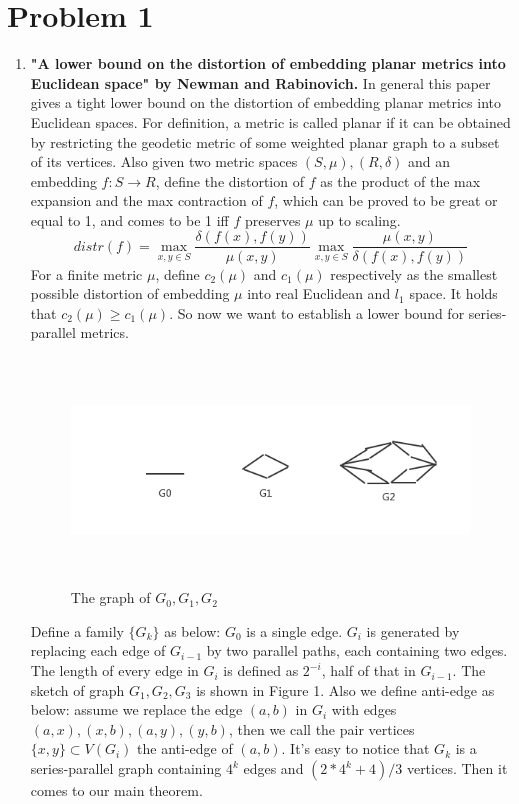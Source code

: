 \documentclass[twoside,11pt]{homework}
\date{Oct 26 2018} %
\begin{document}
\maketitle

\section*{Problem 1}
\begin{enumerate}
    \item\textbf{ "A lower bound on the distortion of embedding planar metrics into Euclidean space" by Newman and Rabinovich.}
    \newline
    In general this paper gives a tight lower bound on the distortion of embedding planar metrics into Euclidean spaces. For definition, a metric is called planar if it can be obtained by restricting the geodetic metric of some weighted planar graph to a subset of its vertices. Also given two metric spaces $(S,\mu),(R,\delta)$ and an embedding $f: S \rightarrow R$, define the distortion of $f$ as the product of the max expansion and the max contraction of $f$, which can be proved to be great or equal to 1, and comes to be 1 iff $f$ preserves $\mu$ up to scaling.
    $$distr(f)=\underset{x,y \in S}{\max}\frac{\delta(f(x),f(y))}{\mu(x,y)} \underset{x,y\in S}{\max} \frac{\mu(x,y)}{\delta(f(x),f(y))}$$
    For a finite metric $\mu$, define $c_2(\mu)$ and $c_1(\mu)$ respectively as the smallest possible distortion of embedding $\mu$ into real Euclidean and $l_1$ space. It holds that $c_2(\mu) \geq c_1(\mu)$. So now we want to establish a lower bound for series-parallel metrics.
    \begin{figure}[]
    \includegraphics[height=6.0cm]{graph.png}
    \caption{The graph of $G_0,G_1,G_2$}
    \end{figure}
    Define a family $\{G_k\}$ as below: $G_0$ is a single edge. $G_i$ is generated by replacing each edge of $G_{i-1}$ by two parallel paths, each containing two edges. The length of every edge in $G_i$ is defined as $2^{-i}$, half of that in $G_{i-1}$. The sketch of graph $G_1,G_2,G_3$ is shown in Figure 1. Also we define anti-edge as below: assume we replace the edge $(a,b)$ in $G_i$ with edges $(a,x), (x,b), (a,y), (y,b)$, then we call the pair vertices $\{x,y\} \subset V(G_i)$ the anti-edge of $(a,b)$. It's easy to notice that $G_k$ is a series-parallel graph containing $4^k$ edges and $(2*4^k+4)/3$ vertices. Then it comes to our main theorem.
    

\end{enumerate}
\end{document}
